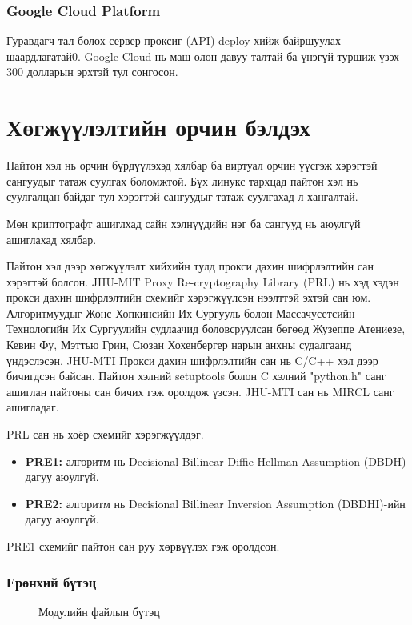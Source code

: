 \subsubsection*{Google Cloud Platform}
Гуравдагч тал болох сервер проксиг (API) deploy хийж байршуулах шаардлагатай0. Google Cloud нь маш олон давуу талтай ба үнэгүй туршиж үзэх 300 долларын эрхтэй тул сонгосон.

\section{Хөгжүүлэлтийн орчин бэлдэх}
Пайтон хэл нь орчин бүрдүүлэхэд хялбар ба виртуал орчин үүсгэж хэрэгтэй сангуудыг татаж суулгах боломжтой. Бүх линукс тархцад пайтон хэл нь суулгалцан байдаг тул хэрэгтэй сангуудыг татаж суулгахад л хангалтай.

Мөн криптографт ашиглхад сайн хэлнүүдийн нэг ба сангууд нь аюулгүй ашиглахад хялбар.\cite{cryptographyTopLanguaes}

Пайтон хэл дээр хөгжүүлэлт хийхийн тулд прокси дахин шифрлэлтийн сан хэрэгтэй болсон.
JHU-MIT Proxy Re-cryptography Library (PRL) нь хэд хэдэн прокси дахин шифрлэлтийн схемийг хэрэгжүүлсэн нээлттэй эхтэй сан юм. Алгоритмуудыг Жонс Хопкинсийн Их Сургууль болон Массачусетсийн Технологийн Их Сургуулийн судлаачид боловсруулсан бөгөөд Жузеппе Атениезе, Кевин Фу, Мэттью Грин, Сюзан Хохенбергер нарын анхны судалгаанд үндэслэсэн.
JHU-MTI Прокси дахин шифрлэлтийн сан нь C/C++ хэл дээр бичигдсэн байсан. Пайтон хэлний setuptools болон C хэлний "python.h" санг ашиглан пайтоны сан бичих гэж оролдож үзсэн. JHU-MTI сан нь MIRCL санг ашигладаг.

PRL сан нь хоёр схемийг хэрэгжүүлдэг.
\begin{itemize}
    \item \textbf{PRE1:} алгоритм нь Decisional Billinear Diffie-Hellman Assumption (DBDH) дагуу аюулгүй.
    \item \textbf{PRE2:} алгоритм нь Decisional Billinear Inversion Assumption (DBDHI)-ийн дагуу аюулгүй.
\end{itemize}
PRE1 схемийг пайтон сан руу хөрвүүлэх гэж оролдсон.
\subsubsection*{Ерөнхий бүтэц}

\begin{figure}
    \caption{Модулийн файлын бүтэц}
\end{figure}

